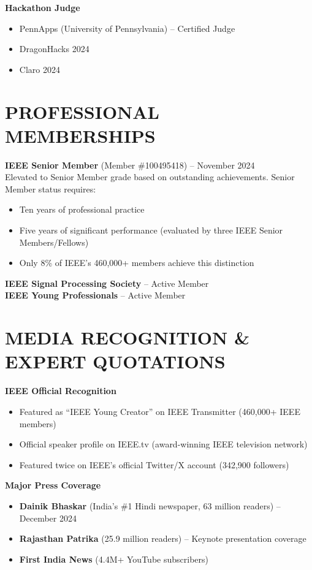 \documentclass[11pt]{article}
\begin{document}
\textbf{Hackathon Judge}
\begin{itemize}
    \item PennApps (University of Pennsylvania) -- Certified Judge
    \item DragonHacks 2024
    \item Claro 2024
\end{itemize}

\section*{PROFESSIONAL MEMBERSHIPS}

\textbf{IEEE Senior Member} (Member \#100495418) -- November 2024\\
Elevated to Senior Member grade based on outstanding achievements. Senior Member status requires:
\begin{itemize}
    \item Ten years of professional practice
    \item Five years of significant performance (evaluated by three IEEE Senior Members/Fellows)
    \item Only 8\% of IEEE's 460,000+ members achieve this distinction
\end{itemize}

\textbf{IEEE Signal Processing Society} -- Active Member\\
\textbf{IEEE Young Professionals} -- Active Member

\section*{MEDIA RECOGNITION \& EXPERT QUOTATIONS}

\textbf{IEEE Official Recognition}
\begin{itemize}
    \item Featured as ``IEEE Young Creator'' on IEEE Transmitter (460,000+ IEEE members)
    \item Official speaker profile on IEEE.tv (award-winning IEEE television network)
    \item Featured twice on IEEE's official Twitter/X account (342,900 followers)
\end{itemize}

\textbf{Major Press Coverage}
\begin{itemize}
    \item \textbf{Dainik Bhaskar} (India's \#1 Hindi newspaper, 63 million readers) -- December 2024
    \item \textbf{Rajasthan Patrika} (25.9 million readers) -- Keynote presentation coverage
    \item \textbf{First India News} (4.4M+ YouTube subscribers)
\end{itemize}
\end{document}
